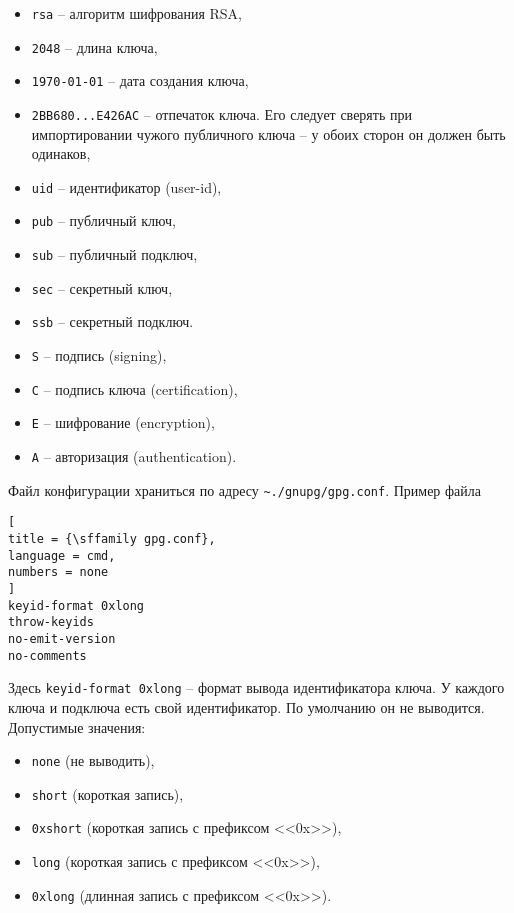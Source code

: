 \documentclass[%
	11pt,
	a4paper,
	utf8,
		]{article}
\begin{document}
\begin{itemize}
	\item \texttt{rsa} -- алгоритм шифрования RSA,
	
	\item \texttt{2048} -- длина ключа,
	
	\item \texttt{1970-01-01} -- дата создания ключа,
	
	\item \texttt{2BB680...E426AC} -- отпечаток ключа. Его следует сверять при импортировании чужого публичного ключа -- у обоих сторон он должен быть одинаков, 
	
	\item \texttt{uid} -- идентификатор (user-id),
	
	\item \texttt{pub} -- публичный ключ,
	
	\item \texttt{sub} -- публичный подключ,
	
	\item \texttt{sec} -- секретный ключ,
	
	\item \texttt{ssb} -- секретный подключ.
	
   \item \texttt{S} -- подпись (signing),
   
   \item \texttt{C} -- подпись ключа (certification),
   
   \item \texttt{E} -- шифрование (encryption),
   
   \item \texttt{A} -- авторизация (authentication).
\end{itemize}

Файл конфигурации храниться по адресу \lstinline{~./gnupg/gpg.conf}. Пример файла

\begin{lstlisting}[
title = {\sffamily gpg.conf},
language = cmd,
numbers = none
]
keyid-format 0xlong
throw-keyids
no-emit-version
no-comments
\end{lstlisting}

Здесь \texttt{keyid-format 0xlong} -- формат вывода идентификатора ключа. У каждого ключа и подключа есть свой идентификатор. По умолчанию он не выводится. Допустимые значения:

\begin{itemize}
	\item \texttt{none} (не выводить),
	
	\item \texttt{short} (короткая запись),
	
	\item \texttt{0xshort} (короткая запись с префиксом <<0x>>),
	
	\item \texttt{long} (короткая запись с префиксом <<0x>>),
	
	\item \texttt{0xlong} (длинная запись с префиксом <<0x>>).
\end{itemize}
\end{document}
